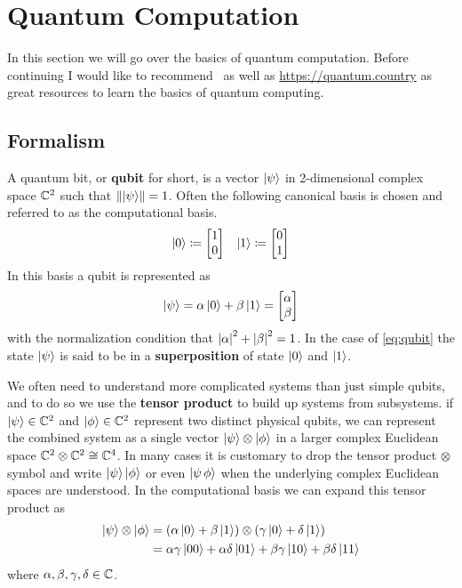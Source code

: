
\section{Quantum Computation}

In this section we will go over the basics of quantum computation.
Before continuing I would like to recommend~\cite{nielsenchuang} as well as \url{https://quantum.country} as great resources to learn the basics of quantum computing.

\subsection{Formalism}

A quantum bit, or \textbf{qubit} for short, is a vector $\ket{\psi}$ in 2-dimensional complex space $\mathbb{C}^2$ such that $\norm{\ket{\psi}} = 1$.
Often the following canonical basis is chosen and referred to as the computational basis.
\begin{align}
    \ket{0} \defeq \mqty[1 \\ 0] & & \ket{1} \defeq \mqty[0 \\ 1]
\end{align}
In this basis a qubit is represented as
\begin{equation}\label{eq:qubit}
    \ket{\psi} = \alpha\ket{0} + \beta\ket{1} = \mqty[\alpha \\ \beta]
\end{equation}
with the normalization condition that $\abs{\alpha}^2 + \abs{\beta}^2 = 1$.
In the case of \cref{eq:qubit} the state $\ket{\psi}$ is said to be in a \textbf{superposition} of state $\ket{0}$ and $\ket{1}$.

We often need to understand more complicated systems than just simple qubits, and to do so we use the \textbf{tensor product} to build up systems from subsystems.
\Eg{} if $\ket{\psi}\in\mathbb{C}^2$ and $\ket{\phi}\in\mathbb{C}^2$ represent two distinct physical qubits, we can represent the combined system as a single vector $\ket{\psi}\otimes \ket{\phi}$ in a larger complex Euclidean space $\mathbb{C}^2\otimes \mathbb{C}^2\cong \mathbb{C}^4$.
In many cases it is customary to drop the tensor product $\otimes$ symbol and write $\ket{\psi}\ket{\phi}$ or even $\ket{\psi \, \phi}$ when the underlying complex Euclidean spaces are understood.
In the computational basis we can expand this tensor product as
\begin{align}
    \ket{\psi}\otimes \ket{\phi} & = \qty(\alpha\ket{0} + \beta\ket{1})\otimes\qty(\gamma\ket{0} + \delta\ket{1})            \\
                                 & = \alpha\gamma\ket{00} + \alpha\delta\ket{01} + \beta\gamma\ket{10} + \beta\delta\ket{11}
\end{align}
where $\alpha, \beta, \gamma, \delta \in \mathbb{C}$.

